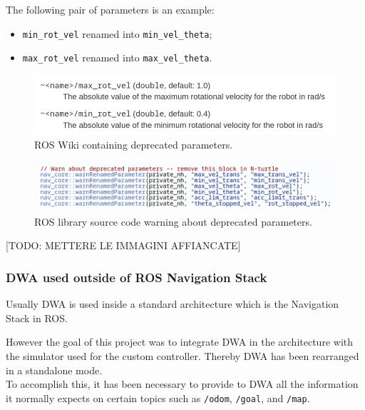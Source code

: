 \documentclass[11pt,a4paper]{article}
\begin{document}
The following pair of parameters is an example:
\begin{itemize}
 \item \texttt{min\_rot\_vel} renamed into \texttt{min\_vel\_theta};
 \item \texttt{max\_rot\_vel} renamed into \texttt{max\_vel\_theta}.\\
\end{itemize}

\begin{figure}[H]
    \centering
    \includegraphics[scale=0.4]{other/deprecated_parameters_description.png}
    \caption{ROS Wiki containing deprecated parameters.}
\end{figure}

\begin{figure}[H]
    \centering
    \includegraphics[scale=0.4]{other/deprecated_parameters_warning.png}
    \caption{ROS library source code warning about deprecated parameters.}
\end{figure}

[TODO: METTERE LE IMMAGINI AFFIANCATE]

\subsubsection{DWA used outside of ROS Navigation Stack}

Usually DWA is used inside a standard architecture which is the Navigation Stack in ROS.

However the goal of this project was to integrate DWA in the architecture with the simulator used for
the custom controller. Thereby DWA has been rearranged in a standalone mode.\\

To accomplish this, it has been necessary to provide to DWA all the information it normally expects on certain topics such as \texttt{/odom}, \texttt{/goal}, and \texttt{/map}.\\
\end{document}
